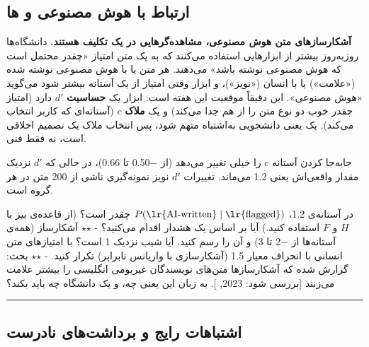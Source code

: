 \subsection{\texorpdfstring{ارتباط با هوش مصنوعی و
ها}{ارتباط با هوش مصنوعی و LLMها}}

\textbf{آشکارسازهای متن هوش مصنوعی، مشاهده‌گرهایی در یک تکلیف 
هستند.} دانشگاه‌ها روزبه‌روز بیشتر از ابزارهایی استفاده می‌کنند که به یک
متن امتیاز «چقدر محتمل است که هوش مصنوعی نوشته باشد» می‌دهند. هر متن یا
با هوش مصنوعی نوشته شده («علامت») یا با انسان («نویز»)، و ابزار وقتی
امتیاز از یک آستانه بیشتر شود می‌گوید «هوش مصنوعی». این دقیقاً موقعیت
 این هفته است: ابزار یک \textbf{حساسیت} \(d'\) دارد (امتیاز چقدر
خوب دو نوع متن را از هم جدا می‌کند) و یک \textbf{ملاک} \(c\) (آستانه‌ای که
کاربر انتخاب می‌کند). یک  یعنی دانشجویی به‌اشتباه متهم
شود، پس انتخاب ملاک یک تصمیم اخلاقی است، نه فقط فنی.

جابه‌جا کردن آستانه \(c\) را خیلی تغییر می‌دهد (از \ensuremath{-}0.50 تا 0.66)، در حالی
که \(d'\) نزدیک مقدار واقعی‌اش یعنی 1.2 می‌ماند. تغییرات \(d'\) نویز
نمونه‌گیری ناشی از 200 متن در هر گروه است.

در آستانه‌ی 1.2، \(P(\text{\lr{AI-written}} \mid \text{\lr{flagged}})\) چقدر است؟
(از قاعده‌ی بیز با \(H\) و \(F\) استفاده کنید.) آیا بر اساس یک هشدار
اقدام می‌کنید؟ - \ensuremath{\star}\ensuremath{\star}  آشکارساز (همه‌ی آستانه‌ها از \ensuremath{-}2 تا 3) و
 آن را رسم کنید. آیا شیب نزدیک 1 است؟ با امتیازهای متن انسانی
با انحراف معیار 1.5 (آشکارسازی با واریانس نابرابر) تکرار کنید. - \ensuremath{\star}\ensuremath{\star} بحث:
گزارش شده که آشکارسازها متن‌های نویسندگان غیربومی انگلیسی را بیشتر علامت
می‌زنند {[}بررسی شود:  2023, \emph{}{]}.
به زبان  این یعنی چه، و یک دانشگاه چه باید بکند؟

\begin{center}\rule{0.5\linewidth}{0.5pt}\end{center}

\subsection{اشتباهات رایج و برداشت‌های نادرست}

